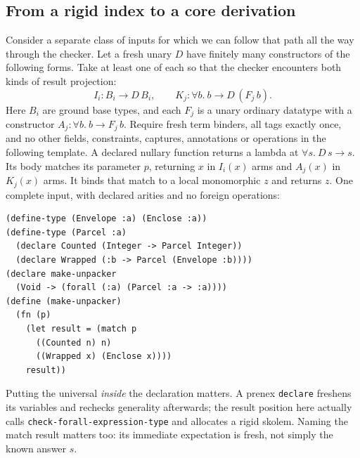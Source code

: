 \documentclass[11pt]{article}
\theoremstyle{definition}
\newcommand{\code}[1]{\texttt{#1}}
\newcommand{\src}[1]{\nolinkurl{#1}}
\newcommand{\arr}{\mathbin{\to}}
\begin{document}
\subsection{From a rigid index to a core derivation}\label{sec:elim}
Consider a separate class of inputs for which we can follow that path all
the way through the checker. Let a fresh unary $D$ have finitely many
constructors of the following forms. Take at least one of each so that
the checker encounters both kinds of result projection:
\[
  I_i:B_i\arr D\,B_i,\qquad
  K_j:\forall b.\ b\arr D\,(F_j\,b).
\]
Here $B_i$ are ground base types, and each $F_j$ is a unary ordinary
datatype with a constructor $A_j:\forall b.\ b\arr F_j\,b$. Require fresh
term binders, all tags exactly once, and no other fields, constraints,
captures, annotations or operations in the following template. A declared
nullary function returns a lambda at $\forall s.\ D\,s\arr s$. Its body
matches its parameter $p$, returning $x$ in $I_i(x)$ arms and $A_j(x)$ in
$K_j(x)$ arms. It binds that match to a local monomorphic $z$ and returns
$z$. One complete input, with declared arities and no foreign operations:
\begin{verbatim}
(define-type (Envelope :a) (Enclose :a))
(define-type (Parcel :a)
  (declare Counted (Integer -> Parcel Integer))
  (declare Wrapped (:b -> Parcel (Envelope :b))))
(declare make-unpacker
  (Void -> (forall (:a) (Parcel :a -> :a))))
(define (make-unpacker)
  (fn (p)
    (let result = (match p
      ((Counted n) n)
      ((Wrapped x) (Enclose x))))
    result))
\end{verbatim}
Putting the universal \emph{inside} the declaration matters. A prenex
\code{declare} freshens its variables and rechecks generality afterwards;
the result position here actually calls \src{check-forall-expression-type}
and allocates a rigid skolem. Naming the match result matters too: its
immediate expectation is fresh, not simply the known answer $s$.
\end{document}
